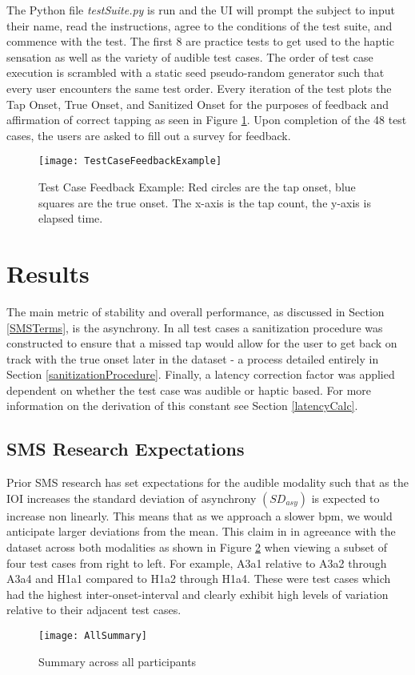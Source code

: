 The Python file \textit{testSuite.py} is run and the UI will prompt the subject to input their name, read the instructions, agree to the conditions of the test suite, and commence with the test. The first 8 are practice tests to get used to the haptic sensation as well as the variety of audible test cases. The order of test case execution is scrambled with a static seed pseudo-random generator such that every user encounters the same test order. Every iteration of the test plots the Tap Onset, True Onset, and Sanitized Onset  for the purposes of feedback and affirmation of correct tapping as seen in Figure \ref{fig:TestCaseFeedbackEx}. Upon completion of the 48 test cases, the users are asked to fill out a survey for feedback.

\begin{figure}[H]
    \centering
    \texttt{[image: TestCaseFeedbackExample]}
    \caption{Test Case Feedback Example: Red circles are the tap onset, blue squares are the true onset. The x-axis is the tap count, the y-axis is elapsed time.}
    \label{fig:TestCaseFeedbackEx}
\end{figure}

\section{Results}\label{Results}
The main metric of stability and overall performance, as discussed in Section \ref{SMSTerms}, is the asynchrony. In all test cases a sanitization procedure was constructed to ensure that a missed tap would allow for the user to get back on track with the true onset later in the dataset - a process detailed entirely in Section \ref{sanitizationProcedure}. Finally, a latency correction factor was applied dependent on whether the test case was audible or haptic based. For more information on the derivation of this constant see Section \ref{latencyCalc}.

\subsection{SMS Research Expectations}
Prior SMS research has set expectations for the audible modality such that as the IOI increases the standard deviation of asynchrony $(SD_{asy})$ is expected to increase non linearly. This means that as we approach a slower bpm, we would anticipate larger deviations from the mean. This claim in in agreeance with the dataset across both modalities as shown in Figure \ref{fig:AllSummary} when viewing a subset of four test cases from right to left. For example, A3a1 relative to A3a2 through A3a4 and H1a1 compared to H1a2 through H1a4. These were test cases which had the highest inter-onset-interval and clearly exhibit high levels of variation relative to their adjacent test cases.
\begin{figure}[H]
    \centering
    \texttt{[image: AllSummary]}
    \caption{Summary across all participants}
    \label{fig:AllSummary}
\end{figure}

